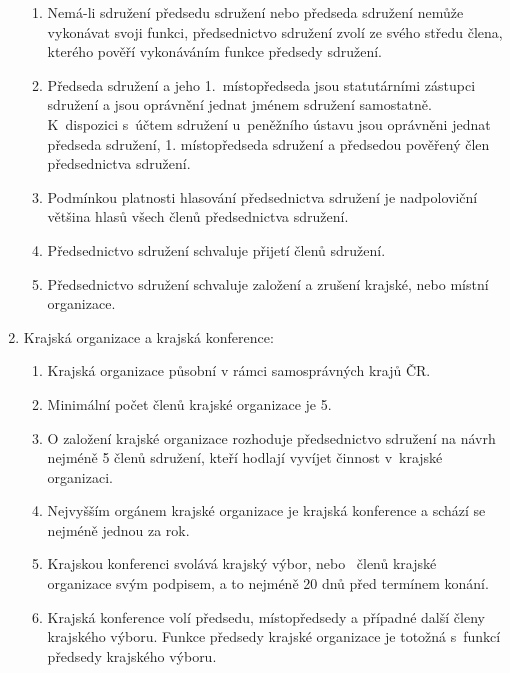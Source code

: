 \documentclass[a4paper]{article}
\begin{document}
\begin{enumerate}
\begin{enumerate}
        \item Nemá-li sdružení předsedu sdružení nebo předseda sdružení nemůže
            vykonávat svoji funkci, předsednictvo sdružení zvolí ze svého
            středu člena, kterého pověří vykonáváním funkce předsedy sdružení.

        \item Předseda sdružení a jeho 1.~místopředseda jsou statutárními
            zástupci sdružení a jsou oprávnění jednat jménem sdružení
            samostatně. K~dispozici s~účtem sdružení u~peněžního ústavu jsou
            oprávněni jednat předseda sdružení, 1. místopředseda sdružení a
            předsedou pověřený člen předsednictva sdružení.

        \item Podmínkou platnosti hlasování předsednictva sdružení je
            nadpoloviční většina hlasů všech členů předsednictva sdružení.

        \item Předsednictvo sdružení schvaluje přijetí členů sdružení.

        \item Předsednictvo sdružení schvaluje založení a zrušení krajské,
            nebo místní organizace.
        \end{enumerate}

    \item Krajská organizace a krajská konference:
        \begin{enumerate}
        \item Krajská organizace působní v rámci samosprávných krajů ČR.

        \item Minimální počet členů krajské organizace je 5.

        \item O založení krajské organizace rozhoduje předsednictvo sdružení na
            návrh nejméně 5 členů sdružení, kteří hodlají vyvíjet činnost
            v~krajské organizaci.

        \item Nejvyšším orgánem krajské organizace je krajská konference a schází
            se nejméně jednou za rok.

        \item Krajskou konferenci svolává krajský výbor, nebo
            ~členů krajské organizace svým podpisem, a to
            nejméně 20 dnů před termínem konání.

        \item Krajská konference volí předsedu, místopředsedy a případné další členy krajského výboru.
            Funkce předsedy krajské organizace je totožná s~funkcí předsedy
            krajského výboru.


\end{enumerate}
\end{enumerate}
\end{document}
